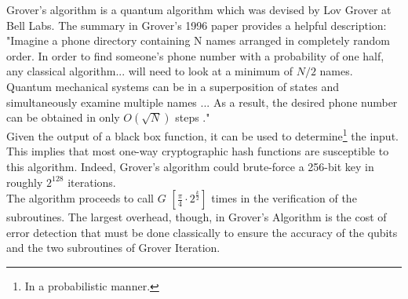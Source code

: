 \documentclass[11pt]{article}
\begin{document}
Grover's algorithm is a quantum algorithm which was devised by Lov Grover at Bell Labs.
The summary in Grover's 1996 paper provides a helpful description:
"Imagine a phone directory containing N names arranged in completely random order. 
In order to find someone's phone number with a probability of one half, 
any classical algorithm... will need to look at a minimum of $N/2$ names. 
Quantum mechanical systems can be in a superposition of states and 
simultaneously examine multiple names ... 
As a result, the desired phone number can be obtained in only $O(\sqrt{N})$ steps \cite{lovgrover}."\\ 

\noindent Given the output of a black box function, it can be used to determine\footnote{In a probabilistic manner.} the input.
This implies that most one-way cryptographic hash functions are susceptible to this algorithm.
Indeed, Grover's algorithm could brute-force a 256-bit key in roughly $2^{128}$ iterations.\\ 

\noindent The algorithm proceeds to call $G$ $[\frac{\pi}{4} \cdot 2^{\frac{k}{2}}]$ times in the verification of the subroutines. The largest overhead, though, in Grover's Algorithm is the cost of error detection that must be done classically to ensure the accuracy of the qubits and the two subroutines of Grover Iteration.\\
\end{document}
